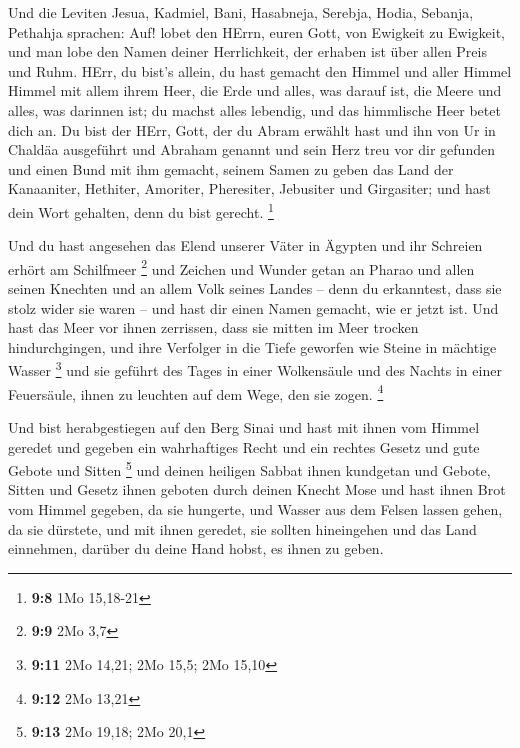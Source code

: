  Und die Leviten Jesua, Kadmiel, Bani, Hasabneja, Serebja,
Hodia, Sebanja, Pethahja sprachen: Auf! lobet den HErrn, euren Gott, von
Ewigkeit zu Ewigkeit, und man lobe den Namen deiner Herrlichkeit, der
erhaben ist über allen Preis und Ruhm.  HErr, du bist's
allein, du hast gemacht den Himmel und aller Himmel Himmel mit allem
ihrem Heer, die Erde und alles, was darauf ist, die Meere und alles, was
darinnen ist; du machst alles lebendig, und das himmlische Heer betet
dich an.  Du bist der HErr, Gott, der du Abram erwählt hast
und ihn von Ur in Chaldäa ausgeführt und Abraham genannt 
und sein Herz treu vor dir gefunden und einen Bund mit ihm gemacht,
seinem Samen zu geben das Land der Kanaaniter, Hethiter, Amoriter,
Pheresiter, Jebusiter und Girgasiter; und hast dein Wort gehalten, denn
du bist gerecht. \footnote{\textbf{9:8} 1Mo 15,18-21}

 Und du hast angesehen das Elend unserer Väter in Ägypten
und ihr Schreien erhört am Schilfmeer \footnote{\textbf{9:9} 2Mo 3,7}
 und Zeichen und Wunder getan an Pharao und allen seinen
Knechten und an allem Volk seines Landes -- denn du erkanntest, dass sie
stolz wider sie waren -- und hast dir einen Namen gemacht, wie er jetzt
ist.  Und hast das Meer vor ihnen zerrissen, dass sie
mitten im Meer trocken hindurchgingen, und ihre Verfolger in die Tiefe
geworfen wie Steine in mächtige Wasser \footnote{\textbf{9:11} 2Mo
  14,21; 2Mo 15,5; 2Mo 15,10}  und sie geführt des Tages in
einer Wolkensäule und des Nachts in einer Feuersäule, ihnen zu leuchten
auf dem Wege, den sie zogen. \footnote{\textbf{9:12} 2Mo 13,21}

 Und bist herabgestiegen auf den Berg Sinai und hast mit
ihnen vom Himmel geredet und gegeben ein wahrhaftiges Recht und ein
rechtes Gesetz und gute Gebote und Sitten \footnote{\textbf{9:13} 2Mo
  19,18; 2Mo 20,1}  und deinen heiligen Sabbat ihnen
kundgetan und Gebote, Sitten und Gesetz ihnen geboten durch deinen
Knecht Mose  und hast ihnen Brot vom Himmel gegeben, da sie
hungerte, und Wasser aus dem Felsen lassen gehen, da sie dürstete, und
mit ihnen geredet, sie sollten hineingehen und das Land einnehmen,
darüber du deine Hand hobst, es ihnen zu geben.


